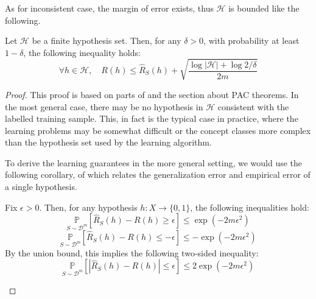 \documentclass[
  journal=largetwo,
  year=2025,
  volume=37,
]{cup-journal}
\begin{document}
As for inconsistent case, the margin of error exists, thus $\mathcal{H}$ is bounded like the following. 

\begin{theorem}\label{thm:theorem_inconsistent}
    Let $\mathcal{H}$ be a finite hypothesis set. Then, for any $\delta > 0$, with probability at least $1-\delta$, the following inequality holds: 
    \begin{equation}
        \forall h \in \mathcal{H}, \quad R(h) \leq \hat{R}_S (h) + \sqrt{\frac{\log{|\mathcal{H}|}+ \log{2/\delta}}{2m}}
    \end{equation}
\end{theorem}

\begin{proof}
    This proof is based on parts of \cite{10.5555/2371238} and the section about PAC theorems. In the most general case, there may be no hypothesis in $\mathcal{H}$ consistent with the labelled training sample. This, in fact is the typical case in practice, where the learning problems may be somewhat difficult or the concept classes more complex than the hypothesis set used by the learning algorithm. 

To derive the learning guarantees in the more general setting, we would use the following corollary, of which relates the generalization error and empirical error of a single hypothesis. 

\begin{col}
    Fix $\epsilon > 0$. Then, for any hypothesis $h: X \to \{0,1\}$, the following inequalities hold: 
    \begin{equation}
        \underset{S\sim \mathcal{D}^m}{\mathbb{P}} \left[\hat{R}_S (h) - R(h) \geq \epsilon\right] \leq \exp{(-2m\epsilon^2)}
    \end{equation}
    \begin{equation}
        \underset{S\sim \mathcal{D}^m}{\mathbb{P}} \left[\hat{R}_S (h) - R(h) \leq -\epsilon\right] \leq -\exp{(-2m\epsilon^2)}
    \end{equation}
    By the union bound, this implies the following two-sided inequality: 
    \begin{equation}
        \underset{S\sim \mathcal{D}^m}{\mathbb{P}} \left[|\hat{R}_S (h) - R(h)| \leq \epsilon\right] \leq 2\exp{(-2m\epsilon^2)}
    \end{equation}
\end{col}


\end{proof}
\end{document}
